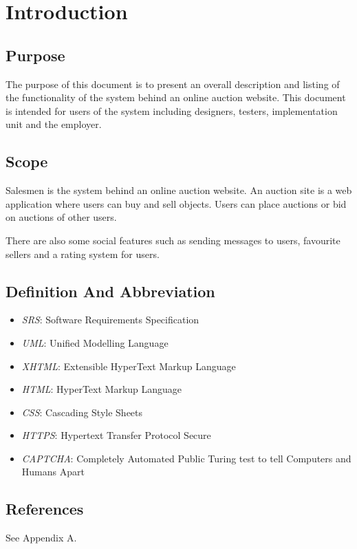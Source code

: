 \chapter{Introduction}
\section{Purpose}

	The purpose of this document is to present an overall description and 
	listing of the functionality of the system behind an online auction 
	website. This document is intended for users of the system including
	designers, testers, implementation unit and the employer.
	
\section{Scope}

	Salesmen is the system behind an online auction website. An auction site 
	is a web application where users can buy and sell objects. Users can 
	place auctions or bid on auctions of other users. 
	
	There are also some social features such as sending messages to users,
	favourite sellers and a rating system for users.
	
\section{Definition And Abbreviation}

	\begin{itemize}
		\item \emph{SRS}: Software Requirements Specification
		\item \emph{UML}: Unified Modelling Language
		\item \emph{XHTML}: Extensible HyperText Markup Language
		\item \emph{HTML}: HyperText Markup Language
		\item \emph{CSS}: Cascading Style Sheets
		\item \emph{HTTPS}: Hypertext Transfer Protocol Secure
		\item \emph{CAPTCHA}: Completely Automated Public Turing test to tell Computers and Humans Apart
	\end{itemize}
	
\section{References}
See Appendix A.

